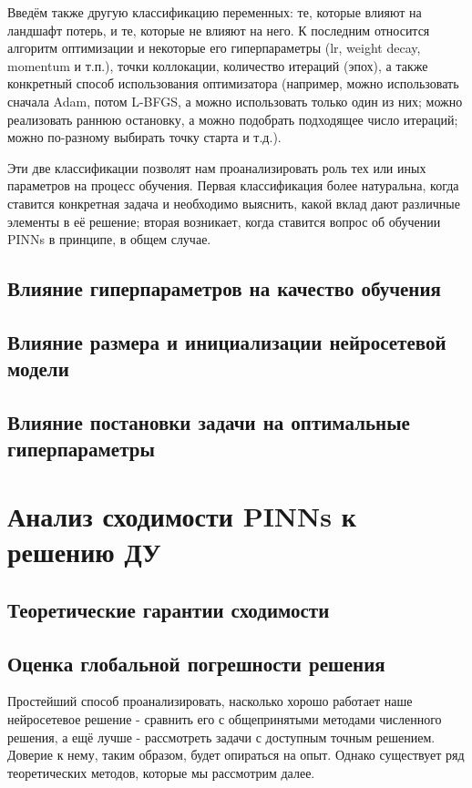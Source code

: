 \documentclass[a4paper, 12pt]{article}
\begin{document}
Введём также другую классификацию переменных: те, которые влияют на ландшафт потерь, и те, которые не влияют на него. К последним относится алгоритм оптимизации и некоторые его гиперпараметры (lr, weight decay, momentum и т.п.), точки коллокации, количество итераций (эпох), а также конкретный способ использования оптимизатора (например, можно использовать сначала Adam, потом L-BFGS, а можно использовать только один из них; можно реализовать раннюю остановку, а можно подобрать подходящее число итераций; можно по-разному выбирать точку старта и т.д.).

Эти две классификации позволят нам проанализировать роль тех или иных параметров на процесс обучения. Первая классификация более натуральна, когда ставится конкретная задача и необходимо выяснить, какой вклад дают различные элементы в её решение; вторая возникает, когда ставится вопрос об обучении PINNs в принципе, в общем случае. 

\subsection{Влияние гиперпараметров на качество обучения}

\subsection{Влияние размера и инициализации нейросетевой модели}

\subsection{Влияние постановки задачи на оптимальные гиперпараметры}

\section{Анализ сходимости PINNs к решению ДУ} \label{section:errorAnalysis}

\subsection{Теоретические гарантии сходимости}

\subsection{Оценка глобальной погрешности решения}

Простейший способ проанализировать, насколько хорошо работает наше нейросетевое решение - сравнить его с общепринятыми методами численного решения, а ещё лучше - рассмотреть задачи с доступным точным решением. Доверие к нему, таким образом, будет опираться на опыт. Однако существует ряд теоретических методов, которые мы рассмотрим далее.
\end{document}
